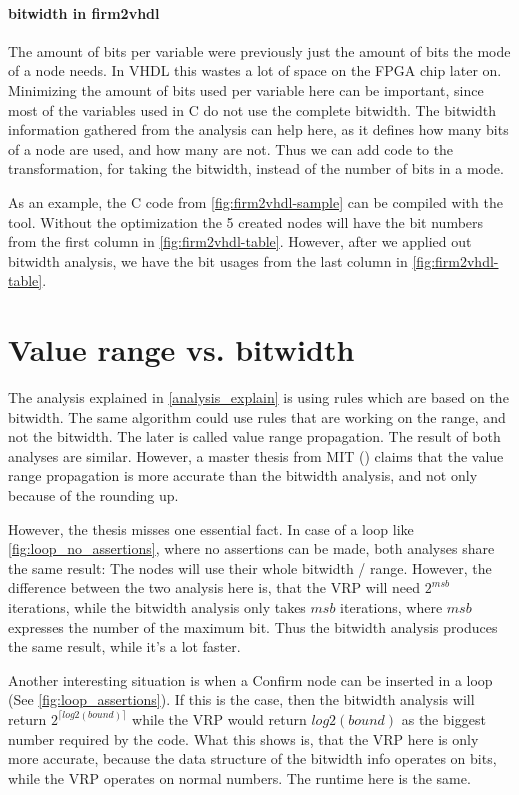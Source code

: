 \paragraph{bitwidth in firm2vhdl}
The amount of bits per variable were previously just the amount of bits the mode of a node needs. In VHDL this wastes a lot of space on the FPGA chip later on. Minimizing the amount of bits used per variable here can be important, since most of the variables used in C do not use the complete bitwidth.\newline
The bitwidth information gathered from the analysis can help here, as it defines how many bits of a node are used, and how many are not. Thus we can add code to the transformation, for taking the bitwidth, instead of the number of bits in a mode.

As an example, the C code from \ref{fig:firm2vhdl-sample} can be compiled with the tool. Without the optimization the 5 created nodes will have the bit numbers from the first column in \ref{fig:firm2vhdl-table}. However, after we applied out bitwidth analysis, we have the bit usages from the last column in \ref{fig:firm2vhdl-table}. 

\section{Value range vs. bitwidth}

The analysis explained in \ref{analysis_explain} is using rules which are based on the bitwidth. The same algorithm could use rules that are working on the range, and not the bitwidth. The later is called value range propagation. The result of both analyses are similar. However, a master thesis from MIT (\cite{bitwidthanalysis-mit-vrp}) claims that the value range propagation is more accurate than the bitwidth analysis, and not only because of the rounding up.



However, the thesis misses one essential fact. In case of a loop like \autoref{fig:loop_no_assertions}, where no assertions can be made, both analyses share the same result: The nodes will use their whole bitwidth / range. However, the difference between the two analysis here is, that the VRP will need $2^{msb}$ iterations, while the bitwidth analysis only takes $msb$ iterations, where $msb$ expresses the number of the maximum bit. Thus the bitwidth analysis produces the same result, while it's a lot faster.

Another interesting situation is when a Confirm node can be inserted in a loop (See \ref{fig:loop_assertions}). If this is the case, then the bitwidth analysis will return $2^{\lceil log2(bound) \rceil}$ while the VRP would return $log2(bound)$ as the biggest number required by the code. What this shows is, that the VRP here is only more accurate, because the data structure of the bitwidth info operates on bits, while the VRP operates on normal numbers. The runtime here is the same.

